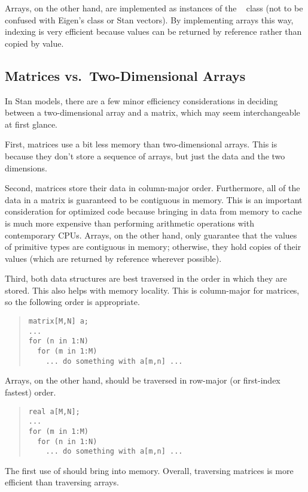 Arrays, on the other hand, are implemented as instances of the \Cpp \ 
 class (not to be confused with Eigen's
 class or Stan vectors).  By implementing arrays
this way, indexing is very efficient because values can be returned by
reference rather than copied by value.

\subsection{Matrices vs.\ Two-Dimensional Arrays}

In Stan models, there are a few minor efficiency considerations in
deciding between a two-dimensional array and a matrix, which may seem
interchangeable at first glance.  

First, matrices use a bit less memory than two-dimensional arrays.
This is because they don't store a sequence of arrays, but just the
data and the two dimensions.  

Second, matrices store their data in column-major order.  Furthermore,
all of the data in a matrix is guaranteed to be contiguous in memory.
This is an important consideration for optimized code because bringing
in data from memory to cache is much more expensive than performing
arithmetic operations with contemporary CPUs.  Arrays, on the other
hand, only guarantee that the values of primitive types are contiguous
in memory; otherwise, they hold copies of their values (which are
returned by reference wherever possible).

Third, both data structures are best traversed in the order in which
they are stored.  This also helps with memory locality.  This is
column-major for matrices, so the following order is appropriate.
%
\begin{quote}
\begin{Verbatim}
matrix[M,N] a;
...
for (n in 1:N)
  for (m in 1:M)
    ... do something with a[m,n] ...
\end{Verbatim}
\end{quote}
%
Arrays, on the other hand, should be traversed in row-major (or
first-index fastest) order.%
%
\begin{quote}
\begin{Verbatim}
real a[M,N];
...
for (m in 1:M)
  for (n in 1:N)
    ... do something with a[m,n] ...
\end{Verbatim}
\end{quote}
%
The first use of  should bring  into memory.
Overall, traversing matrices is more efficient than traversing arrays.

